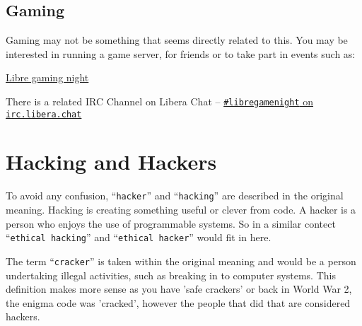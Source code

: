 \documentclass{book}
\newcommand\libera[1]{\href{https://web.libera.chat/?channel=\##1}{\texttt{\##1} on \texttt{irc.libera.chat}}}
\begin{document}
\section{Gaming}

Gaming may not be something that seems directly related to this. You may be interested in running a game server, for friends or to take part in events such as:

\href{https://libregaming.org/}{Libre gaming night}

There is a related IRC Channel on Libera Chat -- \libera{libregamenight}

\chapter{Hacking and Hackers}

To avoid any confusion, ``\verb|hacker|'' and ``\verb|hacking|'' are described in the original meaning. Hacking is creating something useful or clever from code. A hacker is a person who enjoys the use of programmable systems. So in a similar contect ``\verb|ethical hacking|'' and ``\verb|ethical hacker|'' would fit in here.

The term ``\verb|cracker|'' is taken within the original meaning and would be a person undertaking illegal activities, such as breaking in to computer systems. This definition makes more sense as you have 'safe crackers' or back in World War 2, the enigma code was 'cracked', however the people that did that are considered hackers.




\appendix

\end{document}
